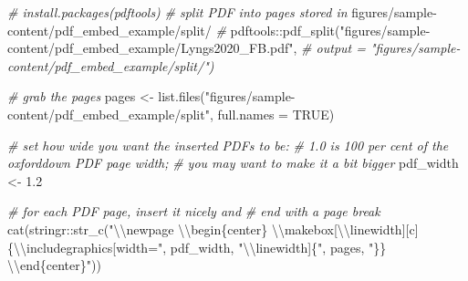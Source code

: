 \documentclass[a4paper, nobind]{templates/ociamthesis}
\newenvironment{Shaded}{\begin{snugshade}}{\end{snugshade}}
\newcommand{\AttributeTok}[1]{\textcolor[rgb]{0.77,0.63,0.00}{#1}}
\newcommand{\CommentTok}[1]{\textcolor[rgb]{0.56,0.35,0.01}{\textit{#1}}}
\newcommand{\ConstantTok}[1]{\textcolor[rgb]{0.00,0.00,0.00}{#1}}
\newcommand{\FloatTok}[1]{\textcolor[rgb]{0.00,0.00,0.81}{#1}}
\newcommand{\FunctionTok}[1]{\textcolor[rgb]{0.00,0.00,0.00}{#1}}
\newcommand{\NormalTok}[1]{#1}
\newcommand{\OtherTok}[1]{\textcolor[rgb]{0.56,0.35,0.01}{#1}}
\newcommand{\SpecialCharTok}[1]{\textcolor[rgb]{0.00,0.00,0.00}{#1}}
\newcommand{\StringTok}[1]{\textcolor[rgb]{0.31,0.60,0.02}{#1}}
\renewenvironment{Shaded}
{
  \vspace{10pt}%
  \begin{snugshade}%
}{%
  \end{snugshade}%
  \vspace{8pt}%
}
\begin{document}
\begin{Shaded}
\begin{Highlighting}[]
\CommentTok{\# install.packages(pdftools)}
\CommentTok{\# split PDF into pages stored in}
\NormalTok{    figures}\SpecialCharTok{/}\NormalTok{sample}\SpecialCharTok{{-}}\NormalTok{content}\SpecialCharTok{/}\NormalTok{pdf\_embed\_example}\SpecialCharTok{/}\NormalTok{split}\SpecialCharTok{/}
\CommentTok{\#}
\NormalTok{    pdftools}\SpecialCharTok{::}\FunctionTok{pdf\_split}\NormalTok{(}\StringTok{"figures/sample{-}content/pdf\_embed\_example/Lyngs2020\_FB.pdf"}\NormalTok{,}
\CommentTok{\# output = "figures/sample{-}content/pdf\_embed\_example/split/")}

\CommentTok{\# grab the pages}
\NormalTok{pages }\OtherTok{\textless{}{-}} \FunctionTok{list.files}\NormalTok{(}\StringTok{"figures/sample{-}content/pdf\_embed\_example/split"}\NormalTok{,}
    \AttributeTok{full.names =} \ConstantTok{TRUE}\NormalTok{)}

\CommentTok{\# set how wide you want the inserted PDFs to be:}
\CommentTok{\# 1.0 is 100 per cent of the oxforddown PDF page width;}
\CommentTok{\# you may want to make it a bit bigger}
\NormalTok{pdf\_width }\OtherTok{\textless{}{-}} \FloatTok{1.2}

\CommentTok{\# for each PDF page, insert it nicely and}
\CommentTok{\# end with a page break}
\FunctionTok{cat}\NormalTok{(stringr}\SpecialCharTok{::}\FunctionTok{str\_c}\NormalTok{(}\StringTok{"}\SpecialCharTok{\textbackslash{}\textbackslash{}}\StringTok{newpage }\SpecialCharTok{\textbackslash{}\textbackslash{}}\StringTok{begin\{center\}}
\StringTok{    }\SpecialCharTok{\textbackslash{}\textbackslash{}}\StringTok{makebox[}\SpecialCharTok{\textbackslash{}\textbackslash{}}\StringTok{linewidth][c]\{}\SpecialCharTok{\textbackslash{}\textbackslash{}}\StringTok{includegraphics[width="}\NormalTok{, pdf\_width,}
    \StringTok{"}\SpecialCharTok{\textbackslash{}\textbackslash{}}\StringTok{linewidth]\{"}\NormalTok{, pages, }\StringTok{"\}\} }\SpecialCharTok{\textbackslash{}\textbackslash{}}\StringTok{end\{center\}"}\NormalTok{))}
\end{Highlighting}
\end{Shaded}
\end{document}
